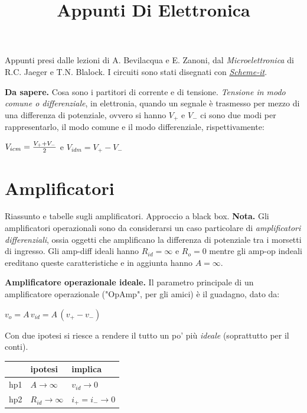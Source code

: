 \documentclass[a4paper,portrait,12pt]{article}
\theoremstyle{definition}
\begin{document}
\title{Appunti Di Elettronica}

\maketitle
\date
\newpage

\tableofcontents
\newpage
 

Appunti presi dalle lezioni di A. Bevilacqua e E. Zanoni, dal \textit{Microelettronica} di R.C. Jaeger e 
T.N. Blalock.
I circuiti sono stati disegnati con \href{http://www.digikey.com/schemeit/}{\textit{Scheme-it}}.
\bigskip

\textbf{Da sapere.} Cosa sono i partitori di corrente e di tensione. \textit{Tensione in modo comune o 
differenziale}, in 
elettronia, quando un segnale è trasmesso per mezzo di una differenza di potenziale, ovvero si hanno 
$V_+$ e $V_-$ ci sono due modi per rappresentarlo, il modo comune e il modo differenziale, rispettivamente:
\begin{center}
$V_{icm} = {V_+ + V_- \over 2}$ \quad e \quad $V_{idm} = V_+ - V_-$
\end{center}

\section{Amplificatori}

Riassunto e tabelle sugli amplificatori. Approccio a black box. \textbf{Nota.} Gli amplificatori operazionali 
sono da considerarsi un caso particolare di \textit{amplificatori differenziali}, ossia oggetti che 
amplificano la differenza di potenziale tra i morsetti di ingresso. Gli amp-diff ideali hanno 
$R_{id} = \infty$ e $R_o = 0$ mentre gli amp-op indeali ereditano queste caratteristiche e in aggiunta hanno 
$A = \infty$.
\bigskip

\textbf{Amplificatore operazionale ideale.} Il parametro principale di un amplificatore operazionale 
("OpAmp", per gli amici) è il guadagno, dato da:
\begin{center}
$ v_o = A\,v_{id} = A\,(v_+ - v_-) $
\end{center}
Con due ipotesi si riesce a rendere il tutto un po' più \textit{ideale} (soprattutto per il conti).

\begin{table}[h]
\begin{center}
\begin{tabular}{|l|l|l|}
\hline
\hline & ipotesi & implica\\
\hline
\hline hp1 & $A \to \infty$ & $v_{id} \to 0$\\
\hline hp2 & $R_{id} \to \infty$ & $i_+ = i_- \to 0$\\
\hline
\end{tabular}
\end{center}
\end{table}
\end{document}
